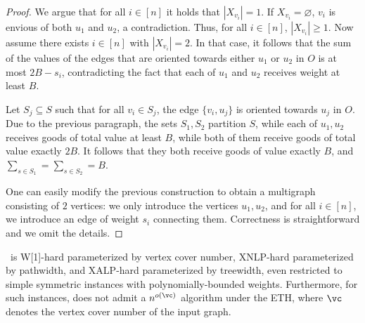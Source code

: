 \documentclass[11pt,letterpaper]{article}
\begin{document}
\begin{proof}
    We argue that for all $i \in [n]$ it holds that $|X_{v_i}| = 1$.
    If $X_{v_i} = \varnothing$, $v_i$ is envious of both $u_1$ and $u_2$, a contradiction.
    Thus, for all $i \in [n]$, $|X_{v_i}| \ge 1$.
    Now assume there exists $i \in [n]$ with $|X_{v_i}| = 2$.
    In that case, it follows that the sum of the values of the edges that are oriented
    towards either $u_1$ or $u_2$ in $O$ is at most $2B - s_i$, contradicting the fact that each of $u_1$ and $u_2$ receives weight at least $B$.

    Let $S_j \subseteq S$ such that for all $v_i \in S_j$, the edge $\{ v_i, u_j \}$ is oriented towards $u_j$ in $O$.
    Due to the previous paragraph, the sets $S_1,S_2$ partition $S$, while each of $u_1,u_2$ receives goods of total value at least $B$,
    while both of them receive goods of total value exactly $2B$.
    It follows that they both receive goods of value exactly $B$, and $\sum_{s \in S_1} = \sum_{s \in S_2} = B$.

    One can easily modify the previous construction to obtain a multigraph consisting of $2$ vertices:
    we only introduce the vertices $u_1,u_2$, and for all $i \in [n]$, we introduce an edge of weight $s_i$ connecting them.
    Correctness is straightforward and we omit the details.
\end{proof}

\begin{theoremrep}[\appsymb]\label{thm:EF:w1h}
    \EFo\ is W[1]-hard parameterized by vertex cover number,
    XNLP-hard parameterized by pathwidth,
    and XALP-hard parameterized by treewidth,
    even restricted to simple symmetric instances with polynomially-bounded weights.
    Furthermore, for such instances, {\EFo} does not admit a $n^{o(\vc)}$ algorithm under the ETH,
    where $\vc$ denotes the vertex cover number of the input graph.
\end{theoremrep}
\end{document}
